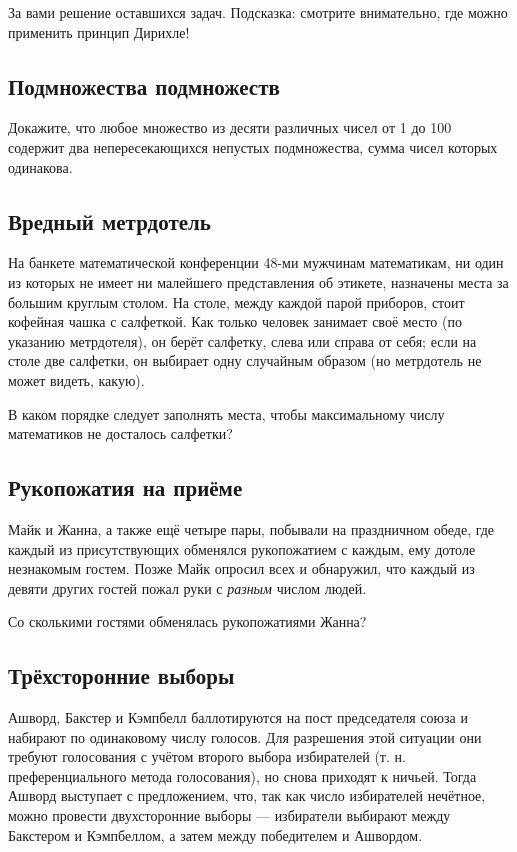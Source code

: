 За вами решение оставшихся задач.
Подсказка: смотрите внимательно, где можно применить принцип Дирихле!

\subsection*{Подмножества подмножеств}%

Докажите, что любое множество из десяти различных чисел от 1 до 100 содержит два непересекающихся непустых подмножества, сумма чисел которых одинакова.

\subsection*{Вредный метрдотель}%

На банкете математической конференции 48-ми мужчинам математикам, ни один из которых не имеет ни малейшего представления об этикете, назначены места за большим круглым столом.
На столе, между каждой парой приборов, стоит кофейная чашка с салфеткой.
Как только человек занимает своё место (по указанию метрдотеля), он берёт салфетку, слева или справа от себя; если на столе две салфетки, он выбирает одну случайным образом (но метрдотель не может видеть, какую).

В каком порядке следует заполнять места, чтобы максимальному числу математиков не досталось салфетки?

\subsection*{Рукопожатия на приёме}%

Майк и Жанна, а также ещё четыре пары, побывали на праздничном обеде, где каждый из присутствующих обменялся рукопожатием с каждым, ему дотоле незнакомым гостем.
Позже Майк опросил всех и обнаружил, что каждый из девяти других гостей пожал руки с \emph{разным} числом людей.

Со сколькими гостями обменялась рукопожатиями Жанна?

\subsection*{Трёхсторонние выборы}%

Ашворд, Бакстер и Кэмпбелл баллотируются на пост председателя союза %
и набирают по одинаковому числу голосов.
Для разрешения этой ситуации они требуют голосования с учётом второго выбора избирателей (т. н. преференциального метода голосования), но снова приходят к ничьей.
Тогда Ашворд выступает с предложением, что, так как число избирателей нечётное, можно провести двухсторонние выборы --- избиратели выбирают между Бакстером и Кэмпбеллом, а затем между победителем и Ашвордом.

